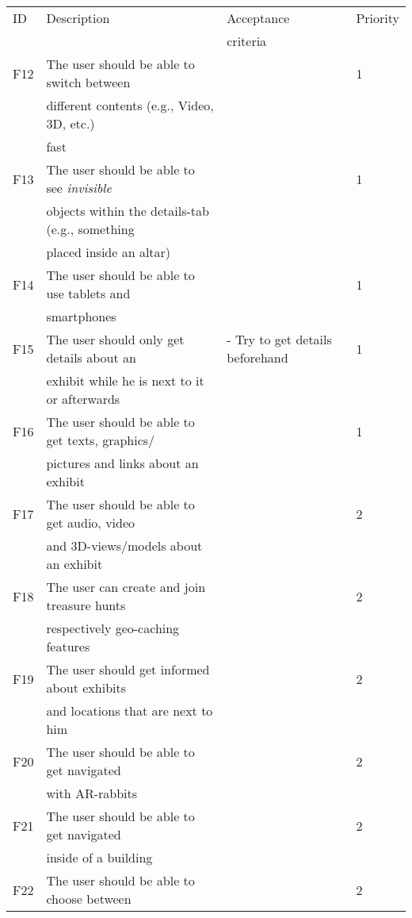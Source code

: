 \begin{table}[h]
\centering%
\begin{tabular}{llll}
	\toprule
ID 	& Description 	& Acceptance 	& Priority \\
 	& 			 & criteria 	&  \\
\cmidrule(rl){1-1}\cmidrule(rl){2-2}\cmidrule(rl){3-3}\cmidrule(rl){4-4}
F12 & The user should be able to switch between 	&  	& 1\\
	& different contents (e.g., Video, 3D, etc.)	&	& \\
	& fast								&	& \\
\hline
F13 & The user should be able to see \textit{invisible} 	&  	& 1\\
	& objects within the details-tab (e.g., something	&	& \\
	& placed inside an altar)						&	& \\
\hline
F14 & The user should be able to use tablets and &  	& 1\\
	& smartphones						&	& \\
\hline
F15 & The user should only get details about an  & - Try to get details beforehand & 1\\
	& exhibit while he is next to it or afterwards &	& \\
\hline
F16 & The user should be able to get texts, graphics/  &  & 1\\
	& pictures and links about an exhibit	&	& \\
\hline
F17 & The user should be able to get audio, video  &  & 2\\
	& and 3D-views/models about an exhibit	&	& \\
\hline
F18 & The user can create and join treasure hunts &  & 2\\
	& respectively geo-caching features		&	& \\
\hline
F19 & The user should get informed about exhibits &  & 2\\
	& and locations that are next to him		&		& \\
\hline
F20 & The user should be able to get navigated 	&  & 2\\
	& with AR-rabbits 						&		& \\
\hline
F21 & The user should be able to get navigated  &  & 2\\
	& inside of a building					&	& \\
\hline
F22 & The user should be able to choose between &  & 2\\

\end{tabular}
\end{table}
